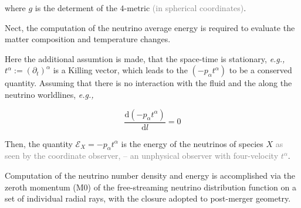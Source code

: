 \documentclass[11pt,a4paper,headinclude=true,DIV=14,BCOR=8mm,chapterprefix,listof=totoc,twoside,openright,abstracton]{scrbook}
\newcommand{\gray}[1]{\textcolor{gray}{#1}}
\newcommand{\dd}{\text{d}}
\begin{document}
where $g$ is the determent of the $4$-metric \gray{(in spherical coordinates)}.




Nect, the computation of the neutrino average energy is required to evaluate the matter composition and temperature changes.

Here the additional assumtion is made, that the space-time is stationary, \textit{e.g.,} $t^{\alpha}:=(\partial_t)^{\alpha}$ is a Killing vector, which leads to the $(-p_{\alpha}t^{\alpha})$ to be a conserved quantity.
Assuming that there is no interaction with the fluid and the along the neutrino worldlines, \textit{e.g.,}

\begin{equation}
    \frac{\dd(-p_{\alpha}t^{\alpha})}{\dd l} = 0
\end{equation}

Then, the quantity $\mathcal{E}_X = -p_{\alpha}t^{\alpha}$ is the energy of the neutrinos of species $X$ \gray{as seen by the coordinate observer, -- an unphysical observer with four-velocity $t^{\alpha}$}.

%
%
%
%
%
%
%


Computation of the 
neutrino number density and energy is 
accomplished via the zeroth momentum (M0) of the free-streaming neutrino distribution function on a set of individual radial rays, with the closure adopted to post-merger geometry.
\end{document}
